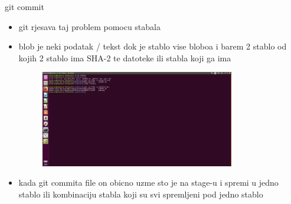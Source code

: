 \documentclass[]{beamer}
\begin{document}
\begin{frame}{git commit}

\begin{itemize}
	\item git rjesava taj problem pomocu stabala
	\item blob je neki podatak / tekst dok je stablo vise bloboa i barem 2 stablo od kojih 2 stablo ima SHA-2 te datoteke ili stabla koji ga ima
	\begin{figure}
		\centering
	\includegraphics[width=0.8\textwidth]{./slike/treca_slika.jpg}
	\end{figure}
	\item kada git commita file on obicno uzme sto je na stage-u i spremi u jedno stablo ili kombinaciju stabla koji su svi spremljeni pod jedno stablo
\end{itemize}
\end{frame}
\end{document}
